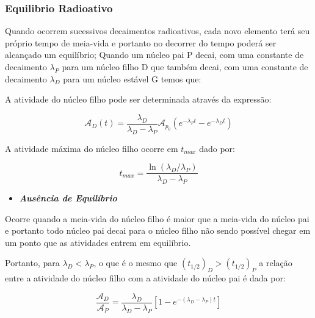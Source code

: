 \documentclass[11pt,a4paper]{article}
\begin{document}
            \subsubsection{Equilibrio Radioativo}

                Quando ocorrem sucessivos decaimentos radioativos, cada novo elemento terá seu próprio tempo de meia-vida e portanto no decorrer do tempo poderá ser alcançado um equilíbrio; Quando um núcleo pai P decai, com uma constante de decaimento $\lambda_P$ para um núcleo filho D que também decai, com uma constante de decaimento $\lambda_D$ para um núcleo estável G temos que: 
                
                \noindent A atividade do núcleo filho pode ser determinada através da expressão:

                \begin{equation}
                    \mathcal{A}_D(t) = \frac{\lambda_D}{\lambda_D - \lambda_P} \mathcal{A}_{p_0}\left(e^{-\lambda_P t} - e^{-\lambda_D t}\right)
                \end{equation}


                \noindent A atividade máxima do núcleo filho ocorre em $t_{max}$ dado por:

                \begin{equation}
                    t_{max} = \frac{\ln (\lambda_D / \lambda_P)}{\lambda_D - \lambda_P}
                \end{equation}

                \begin{itemize}
                    \item \textbf{\textit{\textcolor{CarnationPink}{Ausência de Equilíbrio}}}
                \end{itemize}

                    Ocorre quando a meia-vida do núcleo filho é maior que a meia-vida do núcleo pai e portanto todo núcleo pai decai para o núcleo filho não sendo possível chegar em um ponto que as atividades entrem em equilíbrio.

                    Portanto, para $\lambda_D < \lambda_P$, o que é o mesmo que  $(t_{1/2})_D > (t_{1/2})_P $ a relação entre a atividade do núcleo filho com a atividade do núcleo pai é dada por:

                        \begin{equation}
                            \frac{\mathcal{A}_D}{\mathcal{A}_P} = 
                            \frac{\lambda_D}{\lambda_D - \lambda_P} \left[1 - e^{-(\lambda_D - \lambda_P)t}\right]
                        \end{equation}
                
\end{document}

